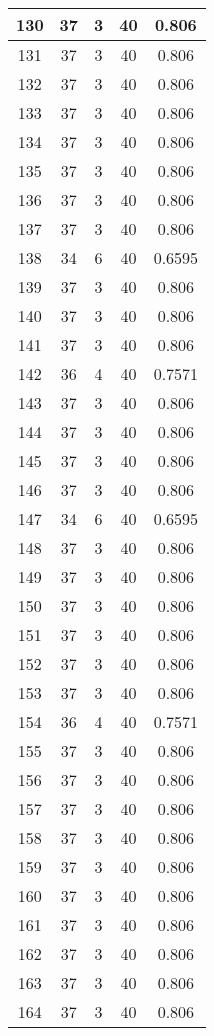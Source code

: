 \documentclass[letterpaper, 12pt]{article}
\begin{document}
\begin{longtable}{|c|c|c|c|c|}
\hline
130 & 37 & 3 & 40 & 0.806 \\
\hline
131 & 37 & 3 & 40 & 0.806 \\
\hline
132 & 37 & 3 & 40 & 0.806 \\
\hline
133 & 37 & 3 & 40 & 0.806 \\
\hline
134 & 37 & 3 & 40 & 0.806 \\
\hline
135 & 37 & 3 & 40 & 0.806 \\
\hline
136 & 37 & 3 & 40 & 0.806 \\
\hline
137 & 37 & 3 & 40 & 0.806 \\
\hline
138 & 34 & 6 & 40 & 0.6595 \\
\hline
139 & 37 & 3 & 40 & 0.806 \\
\hline
140 & 37 & 3 & 40 & 0.806 \\
\hline
141 & 37 & 3 & 40 & 0.806 \\
\hline
142 & 36 & 4 & 40 & 0.7571 \\
\hline
143 & 37 & 3 & 40 & 0.806 \\
\hline
144 & 37 & 3 & 40 & 0.806 \\
\hline
145 & 37 & 3 & 40 & 0.806 \\
\hline
146 & 37 & 3 & 40 & 0.806 \\
\hline
147 & 34 & 6 & 40 & 0.6595 \\
\hline
148 & 37 & 3 & 40 & 0.806 \\
\hline
149 & 37 & 3 & 40 & 0.806 \\
\hline
150 & 37 & 3 & 40 & 0.806 \\
\hline
151 & 37 & 3 & 40 & 0.806 \\
\hline
152 & 37 & 3 & 40 & 0.806 \\
\hline
153 & 37 & 3 & 40 & 0.806 \\
\hline
154 & 36 & 4 & 40 & 0.7571 \\
\hline
155 & 37 & 3 & 40 & 0.806 \\
\hline
156 & 37 & 3 & 40 & 0.806 \\
\hline
157 & 37 & 3 & 40 & 0.806 \\
\hline
158 & 37 & 3 & 40 & 0.806 \\
\hline
159 & 37 & 3 & 40 & 0.806 \\
\hline
160 & 37 & 3 & 40 & 0.806 \\
\hline
161 & 37 & 3 & 40 & 0.806 \\
\hline
162 & 37 & 3 & 40 & 0.806 \\
\hline
163 & 37 & 3 & 40 & 0.806 \\
\hline
164 & 37 & 3 & 40 & 0.806 \\

\end{longtable}
\end{document}
